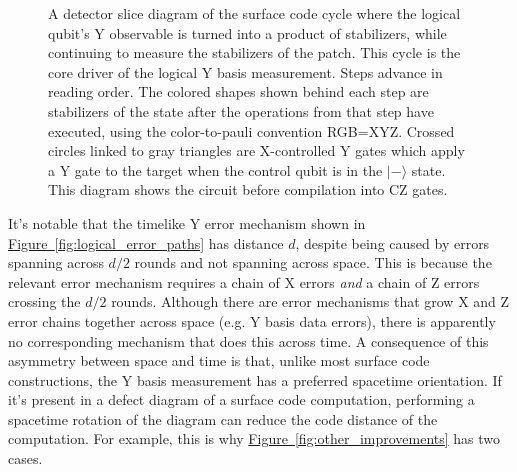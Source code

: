 \documentclass[onecolumn,unpublished,a4paper]{quantumarticle}
\theoremstyle{definition}
\theoremstyle{definition}
\theoremstyle{definition}
\newcommand{\fig}[1]{\hyperref[fig:#1]{Figure~\ref*{fig:#1}}}
\begin{document}
\begin{figure}
    \centering
    \caption{
        A detector slice diagram of the surface code cycle where the logical qubit's Y observable is turned into a product of stabilizers, while continuing to measure the stabilizers of the patch.
        This cycle is the core driver of the logical Y basis measurement.
        Steps advance in reading order.
        The colored shapes shown behind each step are stabilizers of the state after the operations from that step have executed, using the color-to-pauli convention RGB=XYZ.
        Crossed circles linked to gray triangles are X-controlled Y gates which apply a Y gate to the target when the control qubit is in the $|-\rangle$ state.
        This diagram shows the circuit before compilation into CZ gates.
    }
    \label{fig:transition_detector_slices}
\end{figure}

It's notable that the timelike Y error mechanism shown in \fig{logical_error_paths} has distance $d$, despite being caused by errors spanning across $d/2$ rounds and not spanning across space.
This is because the relevant error mechanism requires a chain of X errors \emph{and} a chain of Z errors crossing the $d/2$ rounds.
Although there are error mechanisms that grow X and Z error chains together across space (e.g. Y basis data errors), there is apparently no corresponding mechanism that does this across time.
A consequence of this asymmetry between space and time is that, unlike most surface code constructions, the Y basis measurement has a preferred spacetime orientation.
If it's present in a defect diagram of a surface code computation, performing a spacetime rotation of the diagram can reduce the code distance of the computation.
For example, this is why \fig{other_improvements} has two cases.
\end{document}

